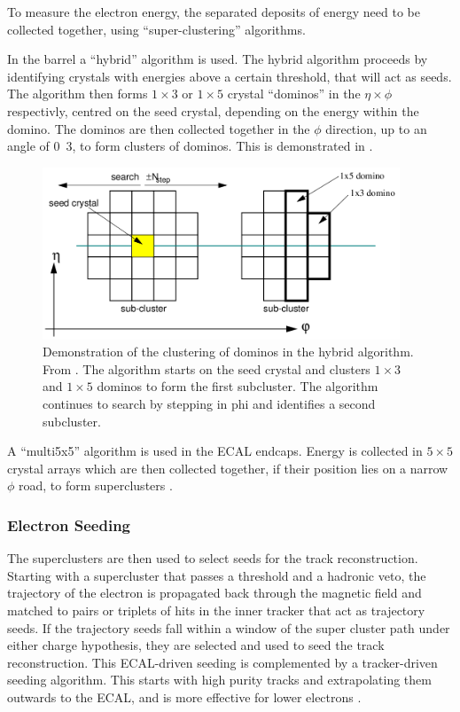 To measure the electron energy, the separated deposits of energy need to be
collected together, using ``super-clustering'' algorithms. 

In the barrel a ``hybrid'' algorithm is used. The hybrid algorithm proceeds by
identifying crystals with energies above a certain threshold, that will act as
seeds. The algorithm then forms $1\times3$ or $1\times5$ crystal ``dominos'' in
the $\eta\times\phi$ respectivly, centred on the seed crystal, depending on the
energy within the domino. The dominos are then collected together in the $\phi$
direction, up to an angle of \unit{0.3}{\rad}, to form clusters of dominos.
This is demonstrated in  \cite{meschi2001electron}.

\begin{figure}[htbp]
  \centering
  \includegraphics[width=0.95\textwidth]{hybridalgo}
  \caption{Demonstration of the clustering of dominos in the hybrid algorithm.
From \cite{meschi2001electron}. The algorithm starts on the seed crystal and clusters
$1\times3$ and $1\times5$ dominos to form the first subcluster. The algorithm continues to search
by stepping in phi and identifies a second subcluster.}
  \label{fig:hybrid}
\end{figure}

A ``multi5x5'' algorithm is used in the ECAL endcaps. Energy is collected in
$5\times5$ crystal arrays which are then collected together, if their position lies on
a narrow $\phi$ road, to form superclusters \cite{meschi2001electron}.

\subsubsection{Electron Seeding}
The superclusters are then used to select seeds for the track reconstruction.
Starting with a supercluster that passes a \pt threshold and a hadronic veto,
the trajectory of the electron is propagated back through the magnetic field and
matched to pairs or triplets of hits in the inner tracker that act as trajectory
seeds.  If the trajectory seeds fall within a window of the super cluster path
under either charge hypothesis, they are selected and used to seed the track
reconstruction.  This ECAL-driven seeding is complemented by a tracker-driven
seeding algorithm.  This starts with high purity tracks and extrapolating them
outwards to the ECAL, and is more effective for lower \pt electrons
\cite{baffioni2007electron,adam2009electron}.

